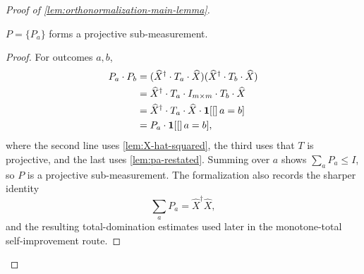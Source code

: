 \begin{proof}[Proof of \ref{lem:orthonormalization-main-lemma}]
	\begin{lemma}[Projectivity of~$P$]\label{lem:P-projectivity}
		\leanok
		$P = \{P_a\}$ forms a projective sub-measurement.
	\end{lemma}
	\begin{proof}
		\leanok
		For outcomes $a,b$,
		\begin{align*}
			P_a \cdot P_b
			 & =
			(\widehat{X}^\dagger \cdot T_a \cdot \widehat{X})
			(\widehat{X}^\dagger \cdot T_b \cdot \widehat{X})                              \\
			 & =
			\widehat{X}^\dagger \cdot T_a \cdot I_{m \times m} \cdot T_b \cdot \widehat{X} \\
			 & =
			\widehat{X}^\dagger \cdot T_a \cdot \widehat{X} \cdot \mathbf{1}\!\left[[\right]a=b]               \\
			 & =
			P_a \cdot \mathbf{1}\!\left[[\right]a=b],
		\end{align*}
		where the second line uses \ref{lem:X-hat-squared}, the third uses that $T$ is projective, and the last uses \ref{lem:pa-restated}. Summing over $a$ shows $\sum_a P_a \leq I$, so $P$ is a projective sub-measurement.  The formalization also records the sharper identity
		\[
			\sum_a P_a=\widehat X^\dagger\widehat X,
		\]
		and the resulting total-domination estimates used later in the monotone-total self-improvement route.
	\end{proof}


\end{proof}
